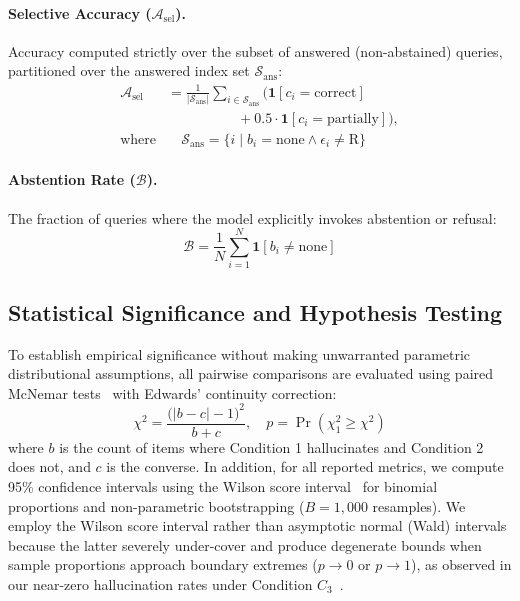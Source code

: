 \paragraph{Selective Accuracy ($\mathcal{A}_{\text{sel}}$).} Accuracy computed strictly over the subset of answered (non-abstained) queries, partitioned over the answered index set $\mathcal{S}_{\text{ans}}$:
\begin{equation}
\begin{split}
    \mathcal{A}_{\text{sel}} &= \frac{1}{|\mathcal{S}_{\text{ans}}|} \sum_{i \in \mathcal{S}_{\text{ans}}} \Big(\mathbf{1}[c_i = \text{correct}] \\
    &\qquad\qquad\quad + 0.5 \cdot \mathbf{1}[c_i = \text{partially}]\Big), \\
    \text{where} &\quad \mathcal{S}_{\text{ans}} = \{i \mid b_i = \text{none} \land \epsilon_i \neq \text{R}\}
\end{split}
\label{eq:selective_accuracy}
\end{equation}

\paragraph{Abstention Rate ($\mathcal{B}$).} The fraction of queries where the model explicitly invokes abstention or refusal:
\begin{equation}
    \mathcal{B} = \frac{1}{N} \sum_{i=1}^N \mathbf{1}[b_i \neq \text{none}]
    \label{eq:abstention_rate}
\end{equation}

\subsection{Statistical Significance and Hypothesis Testing}
To establish empirical significance without making unwarranted parametric distributional assumptions, all pairwise comparisons are evaluated using paired McNemar tests~\citep{mcnemar1947note} with Edwards' continuity correction:
\begin{equation}
    \chi^2 = \frac{\big(|b - c| - 1\big)^2}{b + c}, \quad p = \operatorname{Pr}(\chi^2_1 \ge \chi^2)
    \label{eq:mcnemar}
\end{equation}
where $b$ is the count of items where Condition 1 hallucinates and Condition 2 does not, and $c$ is the converse. In addition, for all reported metrics, we compute 95\% confidence intervals using the Wilson score interval~\citep{wilson1927probable} for binomial proportions and non-parametric bootstrapping ($B = 1,000$ resamples). We employ the Wilson score interval rather than asymptotic normal (Wald) intervals because the latter severely under-cover and produce degenerate bounds when sample proportions approach boundary extremes ($p \to 0$ or $p \to 1$), as observed in our near-zero hallucination rates under Condition $C_3$~\citep{brown2001interval}.

